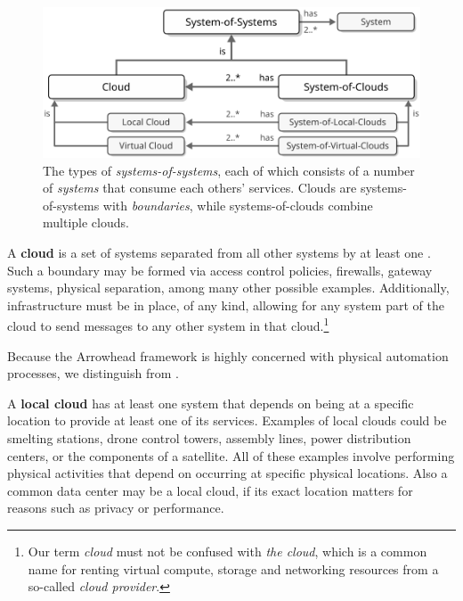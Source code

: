 \vfill

\begin{figure}[ht!]
  \centering
  \includegraphics[scale=0.9]{figures/systems-of-systems}
  \caption{
    The types of \textit{systems-of-systems}, each of which consists of a number of \textit{systems} that consume each others' services.
    Clouds are systems-of-systems with \textit{boundaries}, while systems-of-clouds combine multiple clouds.
  }
  \label{fig:systems-of-systems}
\end{figure}

\vfill

A \textbf{cloud} is a set of systems separated from all other systems by at least one .
Such a boundary may be formed via access control policies, firewalls, gateway systems, physical separation, among many other possible examples.
Additionally, infrastructure must be in place, of any kind, allowing for any system part of the cloud to send messages to any other system in that cloud.\footnote{
  Our term \textit{cloud} must not be confused with \textit{the cloud}, which is a common name for renting virtual compute, storage and networking resources from a so-called \textit{cloud provider}.
}

Because the Arrowhead framework is highly concerned with physical automation processes, we distinguish  from .

A \textbf{local cloud} has at least one system that depends on being at a specific location to provide at least one of its services.
Examples of local clouds could be smelting stations, drone control towers, assembly lines, power distribution centers, or the components of a satellite.
All of these examples involve performing physical activities that depend on occurring at specific physical locations.
Also a common data center may be a local cloud, if its exact location matters for reasons such as privacy or performance.


